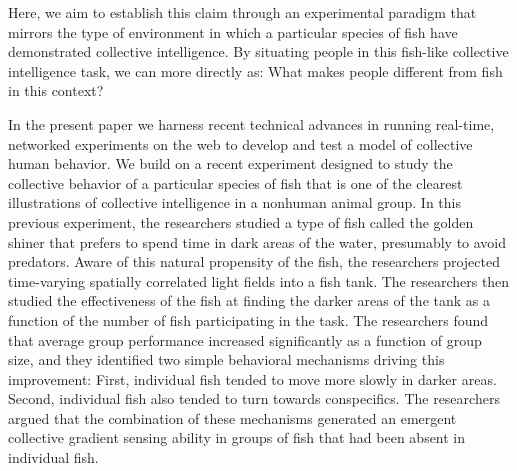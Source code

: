 \documentclass[12pt,letterpaper]{article}
\begin{document}
Here, we aim to establish this claim through an experimental paradigm that mirrors the type of environment in which a particular species of fish have demonstrated collective intelligence. By situating people in this fish-like collective intelligence task, we can more directly as: What makes people different from fish in this context?







In the present paper we harness recent technical advances in running
real-time, networked experiments on the web
\cite{hawkins_conducting_2014} to develop and test a model of
collective human behavior.  We build on a recent experiment designed
to study the collective behavior of a particular species of fish
\cite{berdahl_emergent_2013} that is one of the clearest illustrations
of collective intelligence in a nonhuman animal group.  In this
previous experiment, the researchers studied a type of fish called the
golden shiner that prefers to spend time in dark areas of the water,
presumably to avoid predators.  Aware of this natural propensity of
the fish, the researchers projected time-varying spatially correlated
light fields into a fish tank.  The researchers then studied the
effectiveness of the fish at finding the darker areas of the tank as a
function of the number of fish participating in the task.  The
researchers found that average group performance increased
significantly as a function of group size, and they identified two
simple behavioral mechanisms driving this improvement:
First, individual fish tended to move more slowly in darker areas.
Second, individual fish also tended to turn towards conspecifics.  The
researchers argued that the combination of these mechanisms generated
an emergent collective gradient sensing ability in groups of fish that
had been absent in individual fish.
\end{document}
